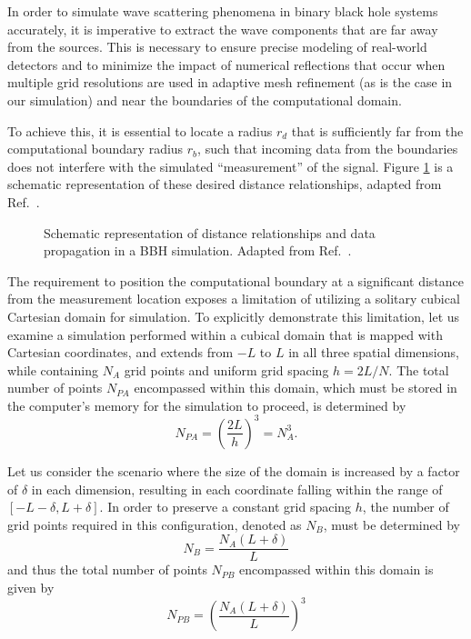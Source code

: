 In order to simulate wave scattering phenomena in binary black hole systems accurately, it is imperative to extract the wave components that are far away from the sources. This is necessary to ensure precise modeling of real-world detectors and to minimize the impact of numerical reflections that occur when multiple grid resolutions are used in adaptive mesh refinement (as is the case in our simulation) and near the boundaries of the computational domain.

To achieve this, it is essential to locate a radius $r_d$ that is sufficiently far from the computational boundary radius $r_b$, such that incoming data from the boundaries does not interfere with the simulated ``measurement'' of the signal. Figure \ref{fig:wave_scattering_multipatch_signal} is a schematic representation of these desired distance relationships, adapted from Ref.~\cite{Reisswig2010}.

\begin{figure}[h]
  \centering
  
  \caption{Schematic representation of distance relationships and data propagation in a BBH simulation. Adapted from Ref.~\cite{Reisswig2010}.}
  \label{fig:wave_scattering_multipatch_signal}
\end{figure}

The requirement to position the computational boundary at a significant distance from the measurement location exposes a limitation of utilizing a solitary cubical Cartesian domain for simulation. To explicitly demonstrate this limitation, let us examine a simulation performed within a cubical domain that is mapped with Cartesian coordinates, and extends from $-L$ to $L$ in all three spatial dimensions, while containing $N_A$ grid points and uniform grid spacing $h=2L/N$. The total number of points $N_{PA}$ encompassed within this domain, which must be stored in the computer's memory for the simulation to proceed, is determined by
%
\begin{equation}
  N_{PA} = \left( \frac{2L}{h} \right)^3 = N_A^3.
  \label{eq:wave_scattering_npa}
\end{equation}

Let us consider the scenario where the size of the domain is increased by a factor of $\delta$ in each dimension, resulting in each coordinate falling within the range of $[-L-\delta, L+\delta]$. In order to preserve a constant grid spacing $h$, the number of grid points required in this configuration, denoted as $N_B$, must be determined by
%
\begin{equation}
  N_{B} = \frac{N_A(L + \delta)}{L}
  \label{eq:wave_scattering_nb}
\end{equation}
%
and thus the total number of points $N_{PB}$ encompassed within this domain is given by
%
\begin{equation}
  N_{PB} = \left(\frac{N_A(L + \delta)}{L}\right)^3
  \label{eq:wave_scattering_npb}
\end{equation}

